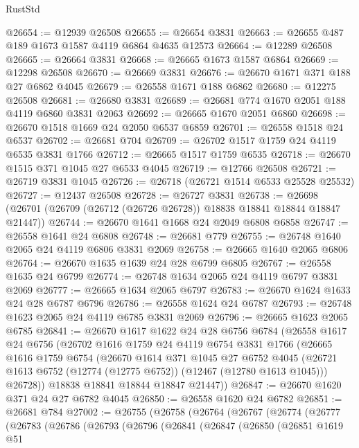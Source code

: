 \begin{lexlean}{RustStd}
\begin{coremodule}
@26654 := @12939 @26508
@26655 := @26654 @3831
@26663 := @26655 @487 @189 @1673 @1587 @4119 @6864 @4635 @12573
@26664 := @12289 @26508
@26665 := @26664 @3831
@26668 := @26665 @1673 @1587 @6864
@26669 := @12298 @26508
@26670 := @26669 @3831
@26676 := @26670 @1671 @371 @188 @27 @6862 @4045
@26679 := @26558 @1671 @188 @6862
@26680 := @12275 @26508
@26681 := @26680 @3831
@26689 := @26681 @774 @1670 @2051 @188 @4119 @6860 @3831 @2063
@26692 := @26665 @1670 @2051 @6860
@26698 := @26670 @1518 @1669 @24 @2050 @6537 @6859
@26701 := @26558 @1518 @24 @6537
@26702 := @26681 @704
@26709 := @26702 @1517 @1759 @24 @4119 @6535 @3831 @1766
@26712 := @26665 @1517 @1759 @6535
@26718 := @26670 @1515 @371 @1045 @27 @6533 @4045
@26719 := @12766 @26508
@26721 := @26719 @3831 @1045
@26726 := @26718 (@26721 @1514 @6533 @25528 @25532)
@26727 := @12437 @26508
@26728 := @26727 @3831
@26738 := @26698 (@26701 (@26709 (@26712 (@26726 @26728)) @18838 @18841 @18844 @18847 @21447))
@26744 := @26670 @1641 @1668 @24 @2049 @6808 @6858
@26747 := @26558 @1641 @24 @6808
@26748 := @26681 @779
@26755 := @26748 @1640 @2065 @24 @4119 @6806 @3831 @2069
@26758 := @26665 @1640 @2065 @6806
@26764 := @26670 @1635 @1639 @24 @28 @6799 @6805
@26767 := @26558 @1635 @24 @6799
@26774 := @26748 @1634 @2065 @24 @4119 @6797 @3831 @2069
@26777 := @26665 @1634 @2065 @6797
@26783 := @26670 @1624 @1633 @24 @28 @6787 @6796
@26786 := @26558 @1624 @24 @6787
@26793 := @26748 @1623 @2065 @24 @4119 @6785 @3831 @2069
@26796 := @26665 @1623 @2065 @6785
@26841 := @26670
    @1617
    @1622
    @24
    @28
    @6756
    @6784
    (@26558
      @1617
      @24
      @6756
      (@26702
        @1616
        @1759
        @24
        @4119
        @6754
        @3831
        @1766
        (@26665
          @1616
          @1759
          @6754
          (@26670
            @1614
            @371
            @1045
            @27
            @6752
            @4045
            (@26721 @1613 @6752 (@12774 (@12775 @6752)) (@12467 (@12780 @1613 @1045)))
            @26728))
        @18838
        @18841
        @18844
        @18847
        @21447))
@26847 := @26670 @1620 @371 @24 @27 @6782 @4045
@26850 := @26558 @1620 @24 @6782
@26851 := @26681 @784
@27002 := @26755
    (@26758
      (@26764
        (@26767
          (@26774
            (@26777
              (@26783
                (@26786
                  (@26793
                    (@26796
                      (@26841
                        (@26847
                          (@26850
                            (@26851
                              @1619
                              @51

\end{coremodule}
\end{lexlean}
